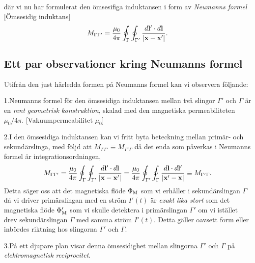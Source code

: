 d{\"a}r vi nu har formulerat den {\"o}msesifiga induktansen i form av
{\it Neumanns formel}
[{\"O}msesidig induktans]
$$
  M_{\Gamma\Gamma'}={{\mu_0}\over{4\pi}}\oint_{\Gamma}\oint_{\Gamma'}
        {{d{\bf l}'\cdot d{\bf l}}\over{|{\bf x}-{\bf x}'|}}.
$$

\subsection{Ett par observationer kring Neumanns formel}
Utifr{\aa}n den just h{\"a}rledda formen p{\aa} Neumanns formel kan vi
observera f{\"o}ljande:
\medskip
\item{1.}{Neumanns formel f{\"o}r den {\"o}msesidiga induktansen mellan
  tv{\aa} slingor $\Gamma'$ och $\Gamma$ {\"a}r en {\it rent geometrisk
  konstruktion}, skalad med den magnetiska permeabiliteten $\mu_0/4\pi$.
  [Vakuumpermeabilitet $\mu_0$]}
\item{2.}{I den {\"o}msesidiga induktansen kan vi fritt byta beteckning
  mellan prim{\"a}r- och sekund{\"a}rslinga, med f{\"o}ljd att
  $M_{\Gamma\Gamma'}\equiv M_{\Gamma'\Gamma}$ d{\aa} det enda som p{\aa}verkas i
  Neumanns formel {\"a}r integrationsordningen,
  $$
    M_{\Gamma\Gamma'}
       ={{\mu_0}\over{4\pi}}\oint_{\Gamma}\oint_{\Gamma'}
          {{d{\bf l}'\cdot d{\bf l}}\over{|{\bf x}-{\bf x}'|}}
       ={{\mu_0}\over{4\pi}}\oint_{\Gamma'}\oint_{\Gamma}
          {{d{\bf l}\cdot d{\bf l}'}\over{|{\bf x}'-{\bf x}|}}
       \equiv M_{\Gamma'\Gamma}.
  $$
  Detta s{\"a}ger oss att det magnetiska fl{\"o}de $\Phi_{\rm M}$ som vi
  erh{\aa}ller i sekund{\"a}rslingan $\Gamma$ d{\aa} vi driver
  prim{\"a}rslingan med en str{\"o}m $I'(t)$ {\"a}r {\it exakt lika stort}
  som det magnetiska fl{\"o}de $\Phi'_{\rm M}$ som vi skulle detektera i
  prim{\"a}rslingan $\Gamma'$ om vi ist{\"a}llet drev sekund{\"a}rslingan
  $\Gamma$ med samma str{\"o}m $I'(t)$. Detta g{\"a}ller oavsett form eller
  inb{\"o}rdes riktning hos slingorna $\Gamma'$ och  $\Gamma$.
  }
\item{3.}{P{\aa} ett djupare plan visar denna {\"o}msesidighet mellan
  slingorna $\Gamma'$ och $\Gamma$ p{\aa} {\it elektromagnetisk
  reciprocitet}.}
\vfill\eject

